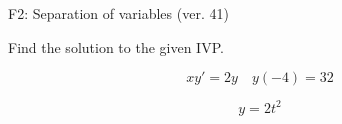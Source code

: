 \begin{exercise}
  \begin{exerciseTitle}F2: Separation of variables (ver. 41)\end{exerciseTitle}
  \begin{exerciseStatement}
    
Find the solution to the given IVP.

    
\[xy'= 2 y \hspace{1em} y( -4 ) = 32\]

  \end{exerciseStatement}
  \begin{exerciseAnswer}
    
\[y= 2 t^ 2\]

  \end{exerciseAnswer}
\end{exercise}